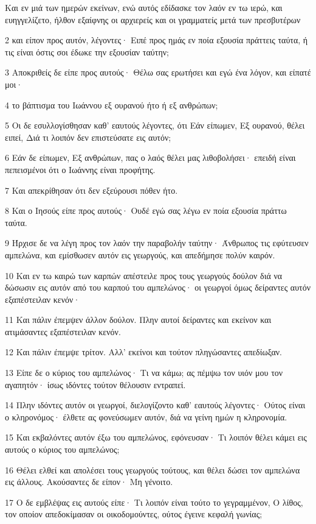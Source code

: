 \par Και εν μιά των ημερών εκείνων, ενώ αυτός εδίδασκε τον λαόν εν τω ιερώ, και ευηγγελίζετο, ήλθον εξαίφνης οι αρχιερείς και οι γραμματείς μετά των πρεσβυτέρων
\par 2 και είπον προς αυτόν, λέγοντες· Ειπέ προς ημάς εν ποία εξουσία πράττεις ταύτα, ή τις είναι όστις σοι έδωκε την εξουσίαν ταύτην;
\par 3 Αποκριθείς δε είπε προς αυτούς· Θέλω σας ερωτήσει και εγώ ένα λόγον, και είπατέ μοι·
\par 4 το βάπτισμα του Ιωάννου εξ ουρανού ήτο ή εξ ανθρώπων;
\par 5 Οι δε εσυλλογίσθησαν καθ' εαυτούς λέγοντες, ότι Εάν είπωμεν, Εξ ουρανού, θέλει ειπεί, Διά τι λοιπόν δεν επιστεύσατε εις αυτόν;
\par 6 Εάν δε είπωμεν, Εξ ανθρώπων, πας ο λαός θέλει μας λιθοβολήσει· επειδή είναι πεπεισμένοι ότι ο Ιωάννης είναι προφήτης.
\par 7 Και απεκρίθησαν ότι δεν εξεύρουσι πόθεν ήτο.
\par 8 Και ο Ιησούς είπε προς αυτούς· Ουδέ εγώ σας λέγω εν ποία εξουσία πράττω ταύτα.
\par 9 Ήρχισε δε να λέγη προς τον λαόν την παραβολήν ταύτην· Άνθρωπος τις εφύτευσεν αμπελώνα, και εμίσθωσεν αυτόν εις γεωργούς, και απεδήμησε πολύν καιρόν.
\par 10 Και εν τω καιρώ των καρπών απέστειλε προς τους γεωργούς δούλον διά να δώσωσιν εις αυτόν από του καρπού του αμπελώνος· οι γεωργοί όμως δείραντες αυτόν εξαπέστειλαν κενόν·
\par 11 Και πάλιν έπεμψεν άλλον δούλον. Πλην αυτοί δείραντες και εκείνον και ατιμάσαντες εξαπέστειλαν κενόν.
\par 12 Και πάλιν έπεμψε τρίτον. Αλλ' εκείνοι και τούτον πληγώσαντες απεδίωξαν.
\par 13 Είπε δε ο κύριος του αμπελώνος· Τι να κάμω; ας πέμψω τον υιόν μου τον αγαπητόν· ίσως ιδόντες τούτον θέλουσιν εντραπεί.
\par 14 Πλην ιδόντες αυτόν οι γεωργοί, διελογίζοντο καθ' εαυτούς λέγοντες· Ούτος είναι ο κληρονόμος· έλθετε ας φονεύσωμεν αυτόν, διά να γείνη ημών η κληρονομία.
\par 15 Και εκβαλόντες αυτόν έξω του αμπελώνος, εφόνευσαν· Τι λοιπόν θέλει κάμει εις αυτούς ο κύριος του αμπελώνος;
\par 16 Θέλει ελθεί και απολέσει τους γεωργούς τούτους, και θέλει δώσει τον αμπελώνα εις άλλους. Ακούσαντες δε είπον· Μη γένοιτο.
\par 17 Ο δε εμβλέψας εις αυτούς είπε· Τι λοιπόν είναι τούτο το γεγραμμένον, Ο λίθος, τον οποίον απεδοκίμασαν οι οικοδομούντες, ούτος έγεινε κεφαλή γωνίας;
